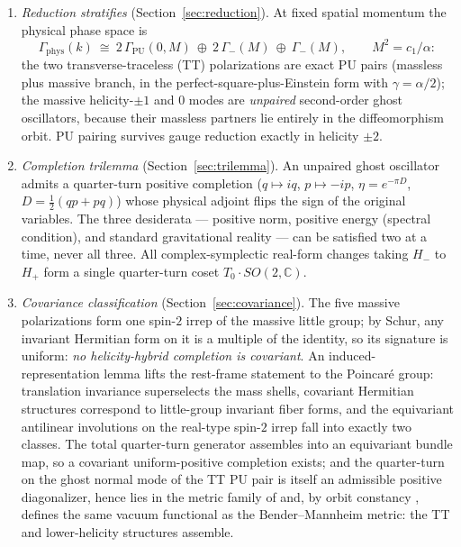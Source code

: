 \documentclass[11pt]{article}
\theoremstyle{definition}
\theoremstyle{remark}
\newcommand{\C}{\mathbb{C}}
\begin{document}
\begin{enumerate}
\item \emph{Reduction stratifies} (Section~\ref{sec:reduction}).  At fixed
spatial momentum the physical phase space is
\begin{equation}\label{eq:strat}
\Gamma_{\mathrm{phys}}(k)\ \cong\
2\,\Gamma_{\mathrm{PU}}(0,M)\ \oplus\ 2\,\Gamma_-(M)\ \oplus\ \Gamma_-(M),
\qquad M^2=c_1/\alpha:
\end{equation}
the two transverse-traceless (TT) polarizations are exact PU pairs
(massless plus massive branch, in the perfect-square-plus-Einstein form
with $\gamma=\alpha/2$); the massive helicity-$\pm1$ and $0$ modes are
\emph{unpaired} second-order ghost oscillators, because their massless
partners lie entirely in the diffeomorphism orbit.  PU pairing survives
gauge reduction exactly in helicity $\pm2$.

\item \emph{Completion trilemma} (Section~\ref{sec:trilemma}).  An
unpaired ghost oscillator admits a quarter-turn positive completion
($q\mapsto iq$, $p\mapsto-ip$, $\eta=e^{-\pi D}$, $D=\tfrac12(qp+pq)$)
whose physical adjoint flips the sign of the original variables.  The
three desiderata --- positive norm, positive energy (spectral condition),
and standard gravitational reality --- can be satisfied two at a time,
never all three.  All complex-symplectic real-form changes taking $H_-$ to
$H_+$ form a single quarter-turn coset $T_0\cdot SO(2,\C)$.

\item \emph{Covariance classification} (Section~\ref{sec:covariance}).
The five massive polarizations form one spin-$2$ irrep of the massive
little group; by Schur, any invariant Hermitian form on it is a multiple
of the identity, so its signature is uniform: \emph{no helicity-hybrid
completion is covariant}.  An induced-representation lemma lifts the
rest-frame statement to the Poincar\'e group: translation invariance
superselects the mass shells, covariant Hermitian structures correspond
to little-group invariant fiber forms, and the equivariant antilinear
involutions on the real-type spin-$2$ irrep fall into exactly two classes.
The total quarter-turn generator assembles into an equivariant bundle map,
so a covariant uniform-positive completion exists; and the quarter-turn on
the ghost normal mode of the TT PU pair is itself an admissible positive
diagonalizer, hence lies in the metric family of \cite{companion1} and, by
orbit constancy \cite{companion3}, defines the same vacuum functional as
the Bender--Mannheim metric: the TT and lower-helicity structures
assemble.


\end{enumerate}
\end{document}
